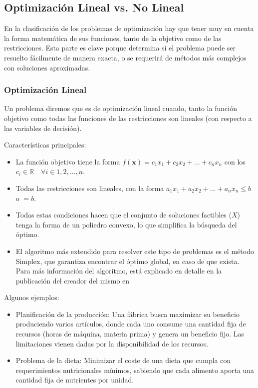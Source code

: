 \documentclass[12pt,a4paper]{book}
\begin{document}
\subsection{Optimización Lineal vs. No Lineal}

En la clasificación de los problemas de optimización hay que tener muy en cuenta la forma matemática de sus funciones, tanto de la objetivo como de las restricciones. Esta parte es clave porque determina si el problema puede ser resuelto fácilmente de manera exacta, o se requerirá de métodos más complejos con soluciones aproximadas.

\subsubsection{Optimización Lineal}
Un problema diremos que es de optimización lineal cuando, tanto la función objetivo como todas las funciones de las restricciones son lineales (con respecto a las variables de decisión). 

Características principales:
\begin{itemize}
    \item La función objetivo tiene la forma $f(\mathbf{x})=c_1x_1+c_2x_2+...+c_nx_n$ con los $c_i \in \mathbb{R} \quad \forall i \in 1,2,...,n$.
    \item Todas las restricciones son lineales, con la forma $a_1x_1+a_2x_2+...+a_nx_n\leq b$ o $=b$.
    \item Todas estas condiciones hacen que el conjunto de soluciones factibles ($X$) tenga la forma de un poliedro convexo, lo que simplifica la búsqueda del óptimo.
    \item El algoritmo más extendido para resolver este tipo de problemas es el método Simplex, que garantiza encontrar el óptimo global, en caso de que exista. Para más información del algoritmo, está explicado en detalle en la publicación del creador del mismo en \cite{Dantzig1951}
\end{itemize}

Algunos ejemplos:
\begin{itemize}
    \item Planificación de la producción: Una fábrica busca maximizar su beneficio produciendo varios artículos, donde cada uno consume una cantidad fija de recursos (horas de máquina, materia prima) y genera un beneficio fijo. Las limitaciones vienen dadas por la disponibilidad de los recursos.
    \item Problema de la dieta: Minimizar el coste de una dieta que cumpla con requerimientos nutricionales mínimos, sabiendo que cada alimento aporta una cantidad fija de nutrientes por unidad.
\end{itemize}
\end{document}
